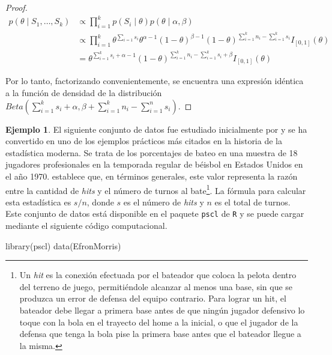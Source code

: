 \documentclass[
  spanish,
]{book}
\newenvironment{Shaded}{\begin{snugshade}}{\end{snugshade}}
\newcommand{\FunctionTok}[1]{\textcolor[rgb]{0.00,0.00,0.00}{#1}}
\newcommand{\NormalTok}[1]{#1}
\theoremstyle{definition}
\theoremstyle{definition}
\newtheorem{example}{Ejemplo}[chapter]
\theoremstyle{definition}
\theoremstyle{definition}
\theoremstyle{remark}
\begin{document}
\begin{proof}
\iffalse{} {Prueba. } \fi{}\begin{align*}
p(\theta \mid S_1,\ldots,S_k)&\propto \prod_{i=1}^kp(S_i \mid \theta)p(\theta \mid \alpha,\beta)\\
&\propto \prod_{i=1}^k\theta^{\sum_{i=1}s_i}\theta^{\alpha-1}(1-\theta)^{\beta-1}
(1-\theta)^{\sum_{i=1}^kn_i-\sum_{i=1}^ks_i}I_{[0,1]}(\theta)\\
&= \theta^{\sum_{i=1}^ks_i+\alpha-1}(1-\theta)^{\sum_{i=1}^kn_i-\sum_{i=1}^ks_i+\beta}I_{[0,1]}(\theta)
\end{align*}

Por lo tanto, factorizando convenientemente, se encuentra una expresión idéntica a la función de densidad de la distribución \(Beta\left(\sum_{i=1}^ks_i+\alpha,\beta+\sum_{i=1}^k n_i-\sum_{i=1}^n s_i\right)\).
\end{proof}

\begin{example}
\protect\hypertarget{exm:unnamed-chunk-23}{}{\label{exm:unnamed-chunk-23} }El siguiente conjunto de datos fue estudiado inicialmente por \citet{Efron75} y se ha convertido en uno de los ejemplos prácticos más citados en la historia de la estadística moderna. Se trata de los porcentajes de bateo en una muestra de 18 jugadores profesionales en la temporada regular de béisbol en Estados Unidos en el año 1970. \citet{wikiBat} establece que, en términos generales, este valor representa la razón entre la cantidad de \emph{hits} y el número de turnos al bate\footnote{Un \emph{hit} es la conexión efectuada por el bateador que coloca la pelota dentro del terreno de juego, permitiéndole alcanzar al menos una base, sin que se produzca un error de defensa del equipo contrario. Para lograr un hit, el bateador debe llegar a primera base antes de que ningún jugador defensivo lo toque con la bola en el trayecto del home a la inicial, o que el jugador de la defensa que tenga la bola pise la primera base antes que el bateador llegue a la misma.}. La fórmula para calcular esta estadística es \(s/n\), donde \(s\) es el número de \emph{hits} y \(n\) es el total de turnos. Este conjunto de datos está disponible en el paquete \texttt{pscl} de \texttt{R} y se puede cargar mediante el siguiente código computacional.
\end{example}

\begin{Shaded}
\begin{Highlighting}[]
\FunctionTok{library}\NormalTok{(pscl)}
\FunctionTok{data}\NormalTok{(EfronMorris)}
\end{Highlighting}
\end{Shaded}
\end{document}
